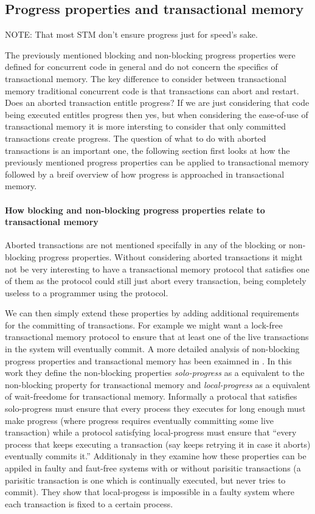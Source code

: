\subsection{Progress properties and transactional memory}
NOTE: That most STM don't ensure progress just for speed's sake.

The previously mentioned blocking and non-blocking progress
properties were defined for concurrent code in general
and do not concern the specifics of transactional memory.
The key difference to consider between transactional memory traditional concurrent
code is that transactions can abort and restart.
Does an aborted transaction entitle progress?
If we are just considering that code being executed entitles
progress then yes, but when considering the ease-of-use of transactional
memory it is more intersting to consider that only committed transactions
create progress.
The question of what to do with aborted transactions is an important one,
the following section first looks at how the previously mentioned progress
properties can be applied to transactional memory
followed by a breif overview of how progress is approached in transactional
memory.

\paragraph{How blocking and non-blocking progress properties relate to transactional memory}
Aborted transactions are not mentioned specifally in any of the blocking
or non-blocking progress properties.
Without considering aborted transactions it might not be very interesting
to have a transactional memory protocol that satisfies one of them
as the protocol could still just abort every transaction, being completely
useless to a programmer using the protocol.

We can then simply extend these properties by adding additional requirements
for the committing of transactions.
For example we might want a lock-free transactional memory protocol
to ensure that at least one of the live transactions in the system will
eventually commit.
A more detailed analysis of non-blocking progress properties and
transactional memory has been exaimned in \cite{}.
In this work they define the non-blocking properties
\emph{solo-progress}
as a equivalent to the non-blocking property
for transactional memory and
\emph{local-progress} as a equivalent
of wait-freedome for transactional memory.
Informally a protocal that satisfies solo-progress must ensure
that every process they executes for long enough
must make progress (where progress requires eventually committing
some live transaction) while a protocol satisfying
local-progress must ensure that
``every process that keeps
executing a transaction (say keeps retrying it in case it aborts)
eventually commits it.''
Additionaly in \cite{} they examine how these properties can be appiled
in faulty and faut-free systems with or without parisitic transactions
(a parisitic transaction is one which is continually executed, but never
tries to commit).
They show that local-progess is impossible in a faulty system
where each transaction is fixed to a certain process.

